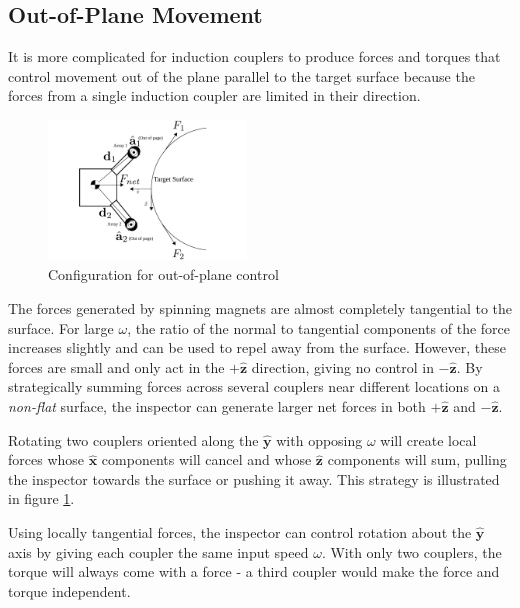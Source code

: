 \documentclass[letterpaper, 10 pt, conference]{ieeeconf}  %
\begin{document}
 


\subsection{Out-of-Plane Movement}\label{sec:oop_movement_desc}

It is more complicated for induction couplers to produce forces and torques that control movement out of the plane parallel to the target surface because the forces from a single induction coupler are limited in their direction. 

  \begin{figure}[thpb]
      \centering
      \includegraphics[width = 0.47\textwidth]{figures/curve_locomotion.pdf}
      \caption{Configuration for out-of-plane control}
      \label{fig:oopsetup}
   \end{figure}
   
\par The forces generated by spinning magnets are almost completely tangential to the surface. For large $\omega$, the ratio of the normal to tangential components of the force increases slightly and can be used to repel away from the surface. However, these forces are small and only act in the $+\hat{\textbf{z}}$ direction, giving no control in $-\hat{\textbf{z}}$. By strategically summing forces across several couplers near different locations on a \textit{non-flat} surface, the inspector can generate larger net forces in both $+\hat{\textbf{z}}$ and $-\hat{\textbf{z}}$. 

\par Rotating two couplers oriented along the $\hat{\textbf{y}}$ with opposing $\omega$ will create local forces whose $\hat{\textbf{x}}$ components will cancel and whose $\hat{\textbf{z}}$ components will sum, pulling the inspector towards the surface or pushing it away. This strategy is illustrated in figure \ref{fig:oopsetup}.     
\par Using locally tangential forces, the inspector can control rotation about the $\hat{\textbf{y}}$ axis by giving each coupler the same input speed $\omega$. With only two couplers, the torque will always come with a force - a third coupler would make the force and torque independent. 
\end{document}
